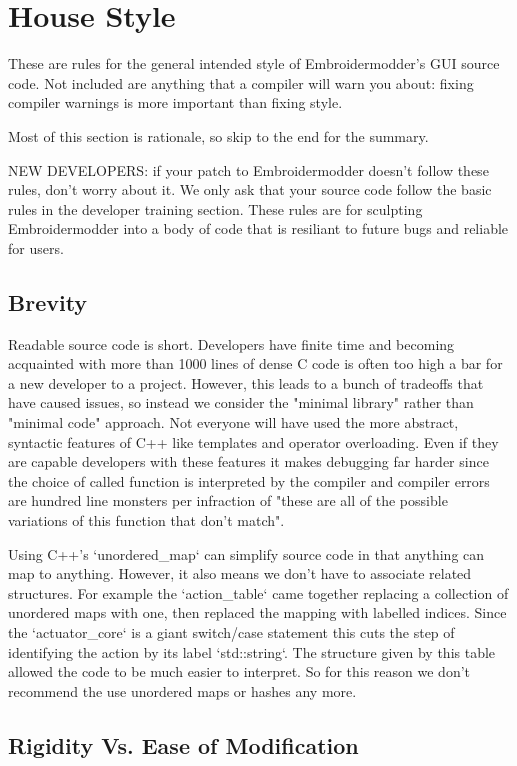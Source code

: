 \section{House Style}

These are rules for the general intended style of Embroidermodder's GUI source
code. Not included are anything that a compiler will warn you about: fixing
compiler warnings is more important than fixing style.

Most of this section is rationale, so skip to the end for the summary.

NEW DEVELOPERS: if your patch to Embroidermodder doesn't follow these rules,
don't worry about it. We only ask that your source code follow the basic rules
in the developer training section. These rules are for sculpting Embroidermodder
into a body of code that is resiliant to future bugs and reliable for users.

\subsection{Brevity}

Readable source code is short. Developers have finite time and becoming
acquainted with more than 1000 lines of dense C code is often too high a bar
for a new developer to a project. However, this leads to a bunch of tradeoffs
that have caused issues, so instead we consider the "minimal library"
rather than "minimal code" approach. Not everyone will have used the more
abstract, syntactic features of C++ like templates and operator overloading.
Even if they are capable developers with these features it makes debugging far
harder since the choice of called function is interpreted by the compiler and compiler
errors are hundred line monsters per infraction of "these are all of the possible
variations of this function that don't match".

Using C++'s `unordered_map` can simplify source code in that anything can
map to anything. However, it also means we don't have to associate related structures.
For example the `action_table` came together replacing a collection of unordered maps
with one, then replaced the mapping with labelled indices. Since the `actuator_core`
is a giant switch/case statement this cuts the step of identifying the action by its
label `std::string`.
The structure given by this table allowed the code to be much
easier to interpret. So for this reason we don't recommend the use unordered maps or hashes any more.

\subsection{Rigidity Vs. Ease of Modification}

